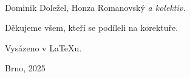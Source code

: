 \thispagestyle{fancy-blank}
\,
\vfill
{\huge\bfseries\utitle\par}
\vspace{5mm}
{\Large Dominik Doležel, Honza Romanovský} \textit{a kolektiv.}\par
\vspace{10mm}
Děkujeme všem, kteří se podíleli na korektuře. \par
Vysázeno v \LaTeX u.\par
Brno, 2025
\clearpage
